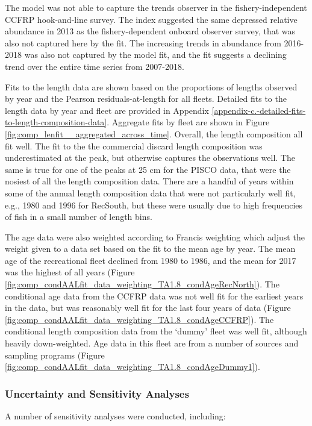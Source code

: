 \documentclass[12pt,]{article}
\begin{document}
The model was not able to capture the trends observer in the
fishery-independent CCFRP hook-and-line survey. The index suggested the
same depressed relative abundance in 2013 as the fishery-dependent
onboard observer survey, that was also not captured here by the fit. The
increasing trends in abundance from 2016-2018 was also not captured by
the model fit, and the fit suggests a declining trend over the entire
time series from 2007-2018.

Fits to the length data are shown based on the proportions of lengths
observed by year and the Pearson residuals-at-length for all fleets.
Detailed fits to the length data by year and fleet are provided in
Appendix \ref{appendix-c.-detailed-fits-to-length-composition-data}.
Aggregate fits by fleet are shown in Figure
\ref{fig:comp_lenfit__aggregated_across_time}. Overall, the length
composition all fit well. The fit to the the commercial discard length
composition was underestimated at the peak, but otherwise captures the
observations well. The same is true for one of the peaks at 25 cm for
the PISCO data, that were the nosiest of all the length composition
data. There are a handful of years within some of the annual length
composition data that were not particularly well fit, e.g., 1980 and
1996 for RecSouth, but these were usually due to high frequencies of
fish in a small number of length bins.

The age data were also weighted according to Francis weighting which
adjust the weight given to a data set based on the fit to the mean age
by year. The mean age of the recreational fleet declined from 1980 to
1986, and the mean for 2017 was the highest of all years (Figure
\ref{fig:comp_condAALfit_data_weighting_TA1.8_condAgeRecNorth}). The
conditional age data from the CCFRP data was not well fit for the
earliest years in the data, but was reasonably well fit for the last
four years of data (Figure
\ref{fig:comp_condAALfit_data_weighting_TA1.8_condAgeCCFRP}). The
conditional length composition data from the `dummy' fleet was well fit,
although heavily down-weighted. Age data in this fleet are from a number
of sources and sampling programs (Figure
\ref{fig:comp_condAALfit_data_weighting_TA1.8_condAgeDummy1}).

\subsubsection{Uncertainty and Sensitivity
Analyses}\label{uncertainty-and-sensitivity-analyses}

A number of sensitivity analyses were conducted, including:
\end{document}
